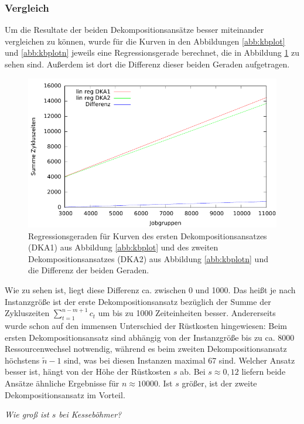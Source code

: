 \documentclass{scrreprt}
\begin{document}
\subsubsection{Vergleich}
Um die Resultate der beiden Dekompositionsansätze besser miteinander vergleichen zu können, wurde für die Kurven in den Abbildungen \ref{abb:kbplot} und \ref{abb:kbplotn}
jeweils eine Regressionsgerade berechnet, die in Abbildung \ref{abb:linreg} zu sehen sind.
Außerdem ist dort die Differenz dieser beiden Geraden aufgetragen.
\begin{figure}
    \begin{center}
        \includegraphics[width=.8\textwidth]{../prog/binpacking/results/linreg.pdf}
    \end{center}
    \caption{
        \label{abb:linreg}
        Regressionsgeraden für Kurven des ersten Dekompositionsansatzes (DKA1) aus Abbildung \ref{abb:kbplot} und 
        des zweiten Dekompositionsansatzes (DKA2) aus Abbildung \ref{abb:kbplotn}
        und die Differenz der beiden Geraden.
    }
\end{figure}
Wie zu sehen ist, liegt diese Differenz ca. zwischen 0 und 1000.
Das heißt je nach Instanzgröße ist der erste Dekompositionsansatz bezüglich der Summe der Zykluszeiten $\sum_{t=1}^{n-m+1}c_t$ um bis zu 1000 Zeiteinheiten besser.
Andererseits wurde schon auf den immensen Unterschied der Rüstkosten hingewiesen: 
Beim ersten Dekompositionsansatz sind abhängig von der Instanzgröße bis zu ca. 8000 Ressourcenwechsel notwendig,
während es beim zweiten Dekompositionsansatz höchstens $\tilde{n}-1$ sind, was bei diesen Instanzen maximal 67 sind.
Welcher Ansatz besser ist, hängt von der Höhe der Rüstkosten $s$ ab.
Bei $s\approx 0{,}12$ liefern beide Ansätze ähnliche Ergebnisse für $n\approx 10000$. 
Ist $s$ größer, ist der zweite Dekompositionsansatz im Vorteil.

\textit{Wie groß ist $s$ bei Kesseböhmer?}
\end{document}
